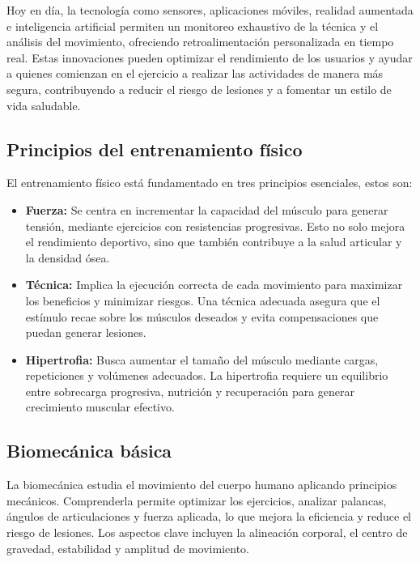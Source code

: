 Hoy en día, la tecnología como sensores, aplicaciones móviles, realidad
aumentada e inteligencia artificial permiten un monitoreo exhaustivo de la
técnica y el análisis del movimiento, ofreciendo retroalimentación
personalizada en tiempo real. Estas innovaciones pueden optimizar el
rendimiento de los usuarios y ayudar a quienes comienzan en el ejercicio a
realizar las actividades de manera más segura, contribuyendo a reducir el
riesgo de lesiones y a fomentar un estilo de vida saludable.

\subsection{Principios del entrenamiento físico}

El entrenamiento físico está fundamentado en tres principios esenciales, estos
son:

\begin{itemize}
    \item \textbf{Fuerza:} Se centra en incrementar la capacidad del músculo para
    generar tensión, mediante ejercicios con resistencias progresivas. Esto no
    solo mejora el rendimiento deportivo, sino que también contribuye a la salud
    articular y la densidad ósea.
    \item \textbf{Técnica:} Implica la ejecución correcta de cada movimiento para
    maximizar los beneficios y minimizar riesgos. Una técnica adecuada asegura
    que el estímulo recae sobre los músculos deseados y evita compensaciones
    que puedan generar lesiones.
    \item \textbf{Hipertrofia:} Busca aumentar el tamaño del músculo mediante
    cargas, repeticiones y volúmenes adecuados. La hipertrofia requiere un
    equilibrio entre sobrecarga progresiva, nutrición y recuperación para
    generar crecimiento muscular efectivo.
\end{itemize}

\subsection{Biomecánica básica}

La biomecánica estudia el movimiento del cuerpo humano aplicando principios
mecánicos. Comprenderla permite optimizar los ejercicios, analizar palancas,
ángulos de articulaciones y fuerza aplicada, lo que mejora la eficiencia y
reduce el riesgo de lesiones. Los aspectos clave incluyen la alineación
corporal, el centro de gravedad, estabilidad y amplitud de movimiento.

